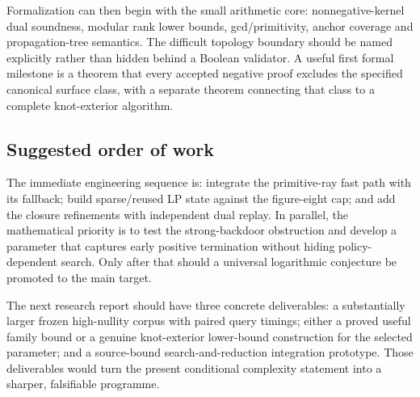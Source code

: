 Formalization can then begin with the small arithmetic core: nonnegative-kernel dual soundness, modular rank lower bounds, gcd/primitivity, anchor coverage and propagation-tree semantics. The difficult topology boundary should be named explicitly rather than hidden behind a Boolean validator. A useful first formal milestone is a theorem that every accepted negative proof excludes the specified canonical surface class, with a separate theorem connecting that class to a complete knot-exterior algorithm.

\subsection{Suggested order of work}

The immediate engineering sequence is: integrate the primitive-ray fast path with its fallback; build sparse/reused LP state against the figure-eight cap; and add the closure refinements with independent dual replay. In parallel, the mathematical priority is to test the strong-backdoor obstruction and develop a parameter that captures early positive termination without hiding policy-dependent search. Only after that should a universal logarithmic conjecture be promoted to the main target.

The next research report should have three concrete deliverables: a substantially larger frozen high-nullity corpus with paired query timings; either a proved useful family bound or a genuine knot-exterior lower-bound construction for the selected parameter; and a source-bound search-and-reduction integration prototype. Those deliverables would turn the present conditional complexity statement into a sharper, falsifiable programme.
